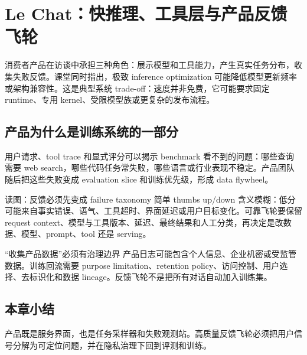 \section{Le Chat：快推理、工具层与产品反馈飞轮}

消费者产品在访谈中承担三种角色：展示模型和工具能力，产生真实任务分布，收集失败反馈。课堂同时指出，极致 inference optimization 可能降低模型更新频率或架构兼容性。这是典型系统 trade-off：速度并非免费，它可能要求固定 runtime、专用 kernel、受限模型族或更复杂的发布流程。

\subsection{产品为什么是训练系统的一部分}

用户请求、tool trace 和显式评分可以揭示 benchmark 看不到的问题：哪些查询需要 web search，哪些代码任务常失败，哪些语言或行业表现不稳定。产品团队随后把这些失败变成 evaluation slice 和训练优先级，形成 data flywheel。


\begin{knowledgebox}{读图：反馈必须先变成 failure taxonomy}
简单 thumbs up/down 含义模糊：低分可能来自事实错误、语气、工具超时、界面延迟或用户目标变化。可靠飞轮要保留 request context、模型与工具版本、延迟、最终结果和人工分类，再决定是改数据、模型、prompt、tool 还是 serving。
\end{knowledgebox}

\begin{warningbox}{“收集产品数据”必须有治理边界}
产品日志可能包含个人信息、企业机密或受监管数据。训练回流需要 purpose limitation、retention policy、访问控制、用户选择、去标识化和数据 lineage。反馈飞轮不是把所有对话自动加入训练集。
\end{warningbox}


\subsection{本章小结}

产品既是服务界面，也是任务采样器和失败观测站。高质量反馈飞轮必须把用户信号分解为可定位问题，并在隐私治理下回到评测和训练。

